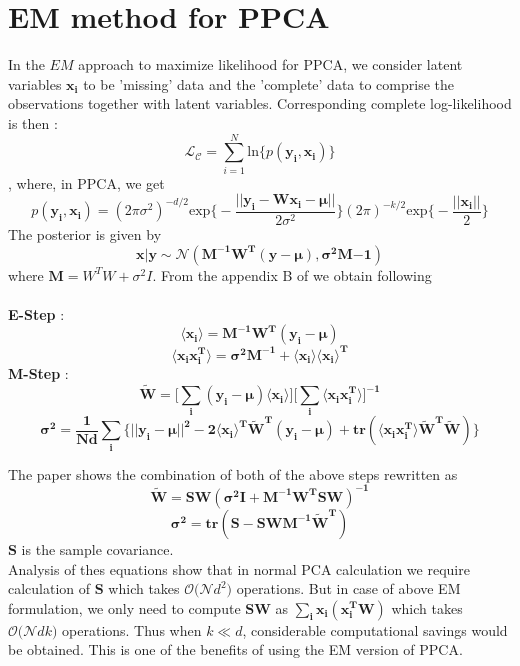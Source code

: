 \section{EM method for PPCA}
In the $EM$ approach to maximize likelihood for PPCA, we consider latent variables $\mathbf{x_i}$ to be 'missing' data and the 'complete' data to comprise the observations together with latent variables. Corresponding complete log-likelihood is then :
\begin{equation} \label{eq1}
\mathcal{L_C} = \sum_{i=1}^N\text{ln}\{p(\mathbf{y_i, x_i})\}
\end{equation},
where, in PPCA, we get
\begin{equation}
p(\mathbf{y_i, x_i}) = (2\pi \sigma^2)^{-d/2}\text{exp}\big\{-\frac{||\mathbf{y_i - Wx_i - \mu}||}{2\sigma^2}\big\}(2\pi)^{-k/2}\text{exp}\big\{-\frac{||\mathbf{x_i}||}{2}\big\}
\end{equation}
The posterior is given by 
\begin{equation}
\mathbf{x|y} \sim \mathcal{N}(\mathbf{M^{-1}W^T(y-\mu), \sigma^2M{-1}})
\end{equation}
where $\mathbf{M} = W^TW + \sigma^2I$.
From the appendix B of \cite{PPCA} we obtain following \\\\
\textbf{E-Step} : 
\begin{equation}
\mathbf{\langle x_i\rangle = M^{-1}W^T(y_i - \mu)}
\end{equation}
\begin{equation}
\mathbf{\langle x_ix_i^T\rangle = \sigma^2M^{-1} + \langle x_i\rangle \langle x_i\rangle^T}
\end{equation}
\textbf{M-Step} :
\begin{equation}
\mathbf{\tilde{W} = \big[ \sum_i(y_i-\mu)\langle x_i\rangle \big]\big[\sum_i\langle x_ix_i^T\rangle \big]^{-1}}
\end{equation}
\begin{equation}
\mathbf{\sigma^2 = \frac{1}{Nd}\sum_i\big\{ ||y_i-\mu||^2 - 2\langle x_i\rangle^T\tilde{W}^T(y_i-\mu) + \text{tr}(\langle x_ix_i^T\rangle\tilde{W}^T\tilde{W}) \big\}}
\end{equation}

The paper \cite{PPCA} shows the combination of both of the above steps rewritten as 
\begin{equation}
\mathbf{\tilde{W} = SW(\sigma^2I + M^{-1}W^TSW)^{-1}}
\end{equation}
\begin{equation}
\mathbf{\sigma^2 = \text{tr}(S-SWM^{-1}\tilde{W}^T)}
\end{equation}
$\mathbf{S}$ is the sample covariance.\\
Analysis of thes equations show that in normal PCA calculation we require calculation of $\mathbf{S}$ which takes $\mathcal{O(N}d^2)$ operations. But in case of above EM formulation, we only need to compute $\mathbf{SW}$ as $\mathbf{\sum_i x_i(x_i^TW)}$ which takes $\mathcal{O(N}dk)$ operations. Thus when $k\ll d$, considerable computational savings would be obtained. This is one of the benefits of using the EM version of PPCA.

